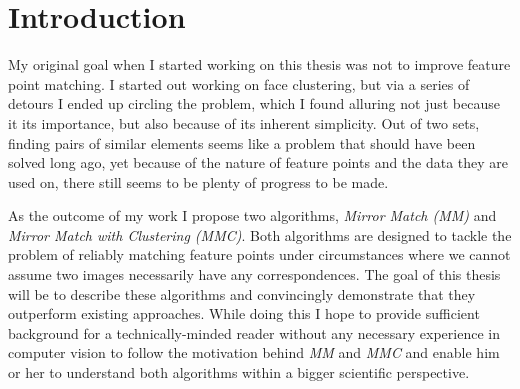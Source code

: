 \chapter*{Introduction}

My original goal when I started working on this thesis was not to 
improve feature point matching. I started out working on face 
clustering, but via a series of detours I ended up circling the problem,
which I found alluring not just because it its importance, but also 
because of its inherent simplicity.  Out of two sets, finding pairs of 
similar elements seems like a problem that should have been solved long 
ago, yet because of the nature of feature points and the data they are 
used on, there still seems to be plenty of progress to be made.

As the outcome of my work I propose two algorithms, \emph{Mirror Match 
(MM)} and \emph{Mirror Match with Clustering (MMC)}. Both algorithms are 
designed to tackle the problem of reliably matching feature points under 
circumstances where we cannot assume two images necessarily have any 
correspondences.  The goal of this thesis will be to describe these 
algorithms and convincingly demonstrate that they outperform existing 
approaches.  While doing this I hope to provide sufficient background 
for a technically-minded reader without any necessary experience in 
computer vision to follow the motivation behind \emph{MM} and \emph{MMC} 
and enable him or her to understand both algorithms within a bigger 
scientific perspective.
 
